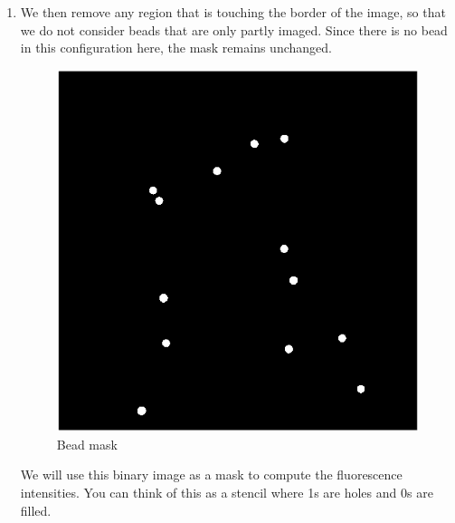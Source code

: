 \documentclass[a4paper]{article}
\begin{document}
\begin{enumerate}
    \item We then remove any region that is touching the border of the image, so that we do not consider beads that are only partly imaged. Since there is no bead in this configuration here, the mask remains unchanged.
    \begin{figure}[H]
        \center
        \label{fig6}
        \includegraphics[scale=0.75]{cleanMask.png}
        \caption{Bead mask}
    \end{figure}

    We will use this binary image as a mask to compute the fluorescence intensities. You can think of this as a stencil where 1s are holes and 0s are filled.


\end{enumerate}
\end{document}
